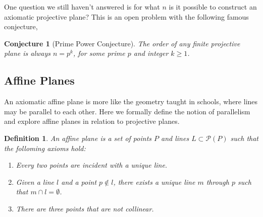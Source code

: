 \documentclass{article}
\newtheorem{definition}{Definition}
\newtheorem{conjecture}{Conjecture}
\newcommand{\PG}{\mathrm{PG}}
\begin{document}
One question we still haven't answered is for what \(n\) is it possible to construct an axiomatic projective plane? This is an open problem with the following famous conjecture,

\begin{conjecture}[Prime Power Conjecture]
  The order of any finite projective plane is always \(n = p^k\), for some prime \(p\) and integer \(k \geq 1\).
\end{conjecture}



\subsection{Affine Planes}

An axiomatic affine plane is more like the geometry taught in schools, where lines may be parallel to each other. Here we formally define the notion of parallelism and explore affine planes in relation to projective planes.

\begin{definition}

  An affine plane is a set of points \(P\) and lines \(L \subset \mathcal{P}(P)\) such that the folloming axioms hold:

  \begin{enumerate}
    \item Every two points are incident with a unique line.~\label{axiom:aff-1}
    \item Given a line \(l\) and a point \(p \notin l\), there exists a unique line \(m\) through \(p\) such that \(m \cap l = \emptyset\).~\label{axiom:aff-2}
    \item There are three points that are not collinear.~\label{axiom:aff-3}
  \end{enumerate}
\end{definition}
\end{document}
